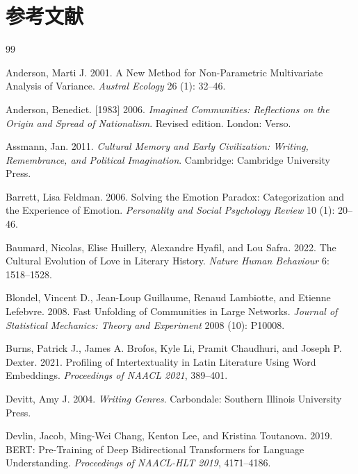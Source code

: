 \documentclass[12pt,a4paper]{article}
\numberwithin{equation}{section}
\begin{document}
\section{参考文献}
{\fontsize{12}{18}\selectfont
\begin{thebibliography}{99}
\providecommand{\url}[1]{\texttt{#1}}
\providecommand{\href}[2]{\texttt{#2}}
\addtolength{\itemsep}{-0.3ex}

\item Anderson, Marti J. 2001. A New Method for Non-Parametric Multivariate Analysis of Variance. \textit{Austral Ecology} 26 (1): 32--46.

\item Anderson, Benedict. [1983] 2006. \textit{Imagined Communities: Reflections on the Origin and Spread of Nationalism}. Revised edition. London: Verso.

\item Assmann, Jan. 2011. \textit{Cultural Memory and Early Civilization: Writing, Remembrance, and Political Imagination}. Cambridge: Cambridge University Press.

\item Barrett, Lisa Feldman. 2006. Solving the Emotion Paradox: Categorization and the Experience of Emotion. \textit{Personality and Social Psychology Review} 10 (1): 20--46.

\item Baumard, Nicolas, Elise Huillery, Alexandre Hyafil, and Lou Safra. 2022. The Cultural Evolution of Love in Literary History. \textit{Nature Human Behaviour} 6: 1518--1528.

\item Blondel, Vincent D., Jean-Loup Guillaume, Renaud Lambiotte, and Etienne Lefebvre. 2008. Fast Unfolding of Communities in Large Networks. \textit{Journal of Statistical Mechanics: Theory and Experiment} 2008 (10): P10008.

\item Burns, Patrick J., James A. Brofos, Kyle Li, Pramit Chaudhuri, and Joseph P. Dexter. 2021. Profiling of Intertextuality in Latin Literature Using Word Embeddings. \textit{Proceedings of NAACL 2021}, 389--401.

\item Devitt, Amy J. 2004. \textit{Writing Genres}. Carbondale: Southern Illinois University Press.

\item Devlin, Jacob, Ming-Wei Chang, Kenton Lee, and Kristina Toutanova. 2019. BERT: Pre-Training of Deep Bidirectional Transformers for Language Understanding. \textit{Proceedings of NAACL-HLT 2019}, 4171--4186.


\end{thebibliography}}
\end{document}
